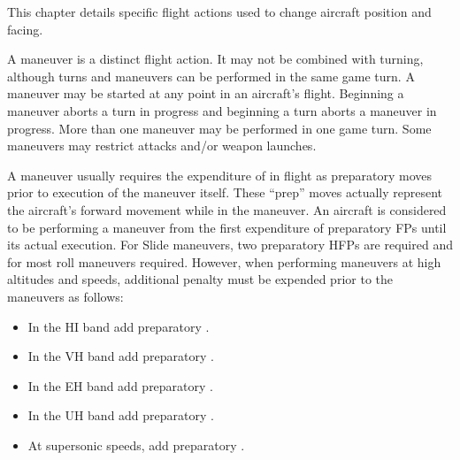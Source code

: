
\label{rule:special-maneuvers}

This chapter details specific flight actions used to change aircraft position and facing.

A maneuver is a distinct flight action. It may not be combined with turning, although turns and maneuvers can be performed in the same game turn. A maneuver may be started at any point in an aircraft's flight. Beginning a maneuver aborts a turn in progress and beginning a turn aborts a maneuver in progress. More than one maneuver may be performed in one game turn. Some maneuvers may restrict attacks and/or weapon launches.


A maneuver usually requires the expenditure of  in flight as preparatory moves prior to execution of the maneuver itself.  These “prep” moves actually represent the aircraft's forward movement while in the maneuver. An aircraft is considered to be performing a maneuver from the first expenditure of preparatory FPs until its actual execution. For Slide maneuvers, two preparatory HFPs are required and for most roll maneuvers  required. However, when performing maneuvers at high altitudes and speeds, additional penalty  must be expended prior to the maneuvers as follows:

\begin{itemize}
    \item In the HI band add  preparatory .
    \item In the VH band add  preparatory .
    \item In the EH band add  preparatory .
    \item In the UH band add  preparatory .
    \item At supersonic speeds, add  preparatory .
\end{itemize}

